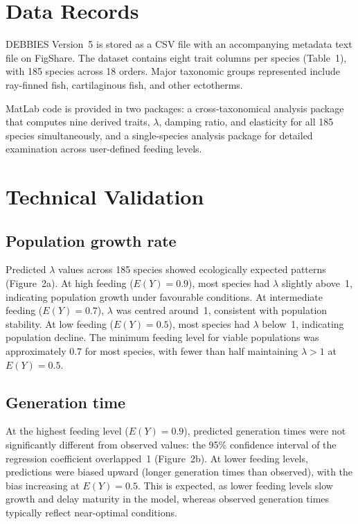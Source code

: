 \documentclass[11pt]{article}
\begin{document}
\section{Data Records}

DEBBIES Version~5 is stored as a CSV file with an accompanying metadata text file on FigShare. The dataset contains eight trait columns per species (Table~1), with 185 species across 18 orders. Major taxonomic groups represented include ray-finned fish, cartilaginous fish, and other ectotherms.

MatLab code is provided in two packages: a cross-taxonomical analysis package that computes nine derived traits, $\lambda$, damping ratio, and elasticity for all 185 species simultaneously, and a single-species analysis package for detailed examination across user-defined feeding levels.

\section{Technical Validation}

\subsection{Population growth rate}

Predicted $\lambda$ values across 185 species showed ecologically expected patterns (Figure~2a). At high feeding ($E(Y) = 0.9$), most species had $\lambda$ slightly above~1, indicating population growth under favourable conditions. At intermediate feeding ($E(Y) = 0.7$), $\lambda$ was centred around~1, consistent with population stability. At low feeding ($E(Y) = 0.5$), most species had $\lambda$ below~1, indicating population decline. The minimum feeding level for viable populations was approximately 0.7 for most species, with fewer than half maintaining $\lambda > 1$ at $E(Y) = 0.5$.

\subsection{Generation time}

At the highest feeding level ($E(Y) = 0.9$), predicted generation times were not significantly different from observed values: the 95\% confidence interval of the regression coefficient overlapped~1 (Figure~2b). At lower feeding levels, predictions were biased upward (longer generation times than observed), with the bias increasing at $E(Y) = 0.5$. This is expected, as lower feeding levels slow growth and delay maturity in the model, whereas observed generation times typically reflect near-optimal conditions.
\end{document}
